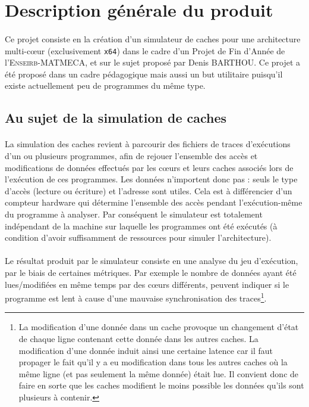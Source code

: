 \section{Description générale du produit}

\paragraph{}
Ce projet consiste en la création d'un simulateur de caches pour une architecture multi-c\oe ur (exclusivement \verb!x64!) dans le cadre d'un Projet de Fin d'Année de l'\textsc{Enseirb-MATMECA}, et sur le sujet proposé par Denis BARTHOU. Ce projet a été proposé dans un cadre pédagogique mais aussi un but utilitaire puisqu'il existe actuellement peu de programmes du même type.

\subsection{Au sujet de la simulation de caches}

\paragraph{}
La simulation des caches revient à parcourir des fichiers de traces d'exécutions d'un ou plusieurs programmes, afin de rejouer l'ensemble des accès et modifications de données effectués par les c\oe urs et leurs caches associés lors de l'exécution de ces programmes. Les données n'importent donc pas : seuls le type d'accès (lecture ou écriture) et l'adresse sont utiles. Cela est à différencier d'un compteur hardware qui détermine l'ensemble des accès pendant l'exécution-même du programme à analyser. Par conséquent le simulateur est totalement indépendant de la machine sur laquelle les programmes ont été exécutés (à condition d'avoir suffisamment de ressources pour simuler l'architecture).   

\paragraph{}
Le résultat produit par le simulateur consiste en une analyse du jeu d'exécution, par le biais de certaines métriques. Par exemple le nombre de données ayant été lues/modifiées en même temps par des c\oe urs différents, peuvent indiquer si le programme est lent à cause d'une mauvaise synchronisation des traces\footnote{La modification d'une donnée dans un cache provoque un changement d'état de chaque ligne contenant cette donnée dans les autres caches. La modification d'une donnée induit ainsi une certaine latence car il faut propager le fait qu'il y a eu modification dans tous les autres caches où la même ligne (et pas seulement la même donnée) était lue. Il convient donc de faire en sorte que les caches modifient le moins possible les données qu'ils sont plusieurs à contenir.}.

